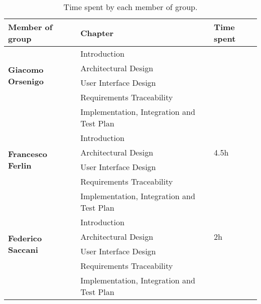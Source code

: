 \begin{table}[H]
    \centering
    \begin{tabular}{|l|l|l|}
        \hline
        \textbf{Member of group }                  & \textbf{Chapter}                          & \textbf{Time spent} \\\hline
        \multirow{4}{*}{\textbf{Giacomo Orsenigo}} & Introduction                              &                     \\
                                                   & Architectural Design                      &                     \\
                                                   & User Interface Design                     &                     \\
                                                   & Requirements Traceability                 &                     \\
                                                   & Implementation, Integration and Test Plan &                     \\\hline
        \multirow{4}{*}{\textbf{Francesco Ferlin}} & Introduction                              &                     \\
                                                   & Architectural Design                      & 4.5h                \\
                                                   & User Interface Design                     &                     \\
                                                   & Requirements Traceability                 &                     \\
                                                   & Implementation, Integration and Test Plan &                     \\\hline
        \multirow{4}{*}{\textbf{Federico Saccani}} & Introduction                              &                     \\
                                                   & Architectural Design                      & 2h                  \\
                                                   & User Interface Design                     &                     \\
                                                   & Requirements Traceability                 &                     \\
                                                   & Implementation, Integration and Test Plan &                     \\\hline
    \end{tabular}
    \caption{Time spent by each member of group.}
    \label{table:Time spent}
\end{table}
